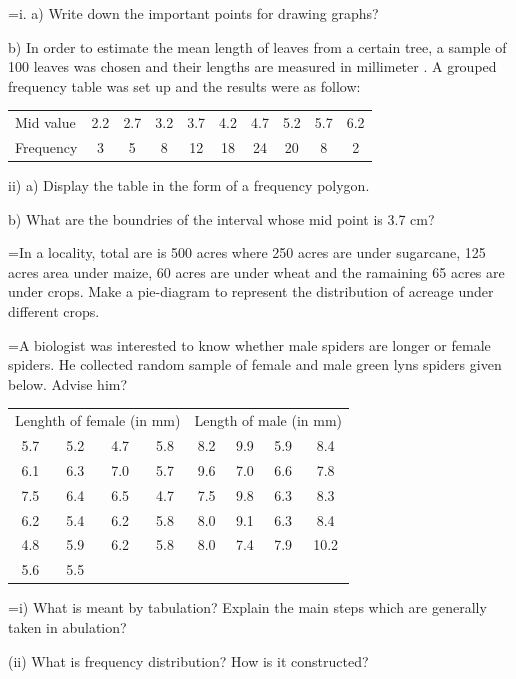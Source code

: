 \documentclass[11pt,a4paper]{article}
\newlength{\qw}
\newcommand{\q}[2]{%
  \Needspace{3\baselineskip}%
  \par\medskip\noindent\hangindent=\qw\hangafter=1\makebox[\qw][l]{\textbf{#1.}}#2\par}
\begin{document}
\q{10}{i. a) Write down the important points for drawing graphs?\par b) In order to estimate the mean length of leaves from a certain tree, a sample of 100 leaves was chosen and their lengths are measured in millimeter . A grouped frequency table was set up and the results were as follow:\par\smallskip
\begin{tabular}{|l|ccccccccc|}\hline
Mid value & 2.2 & 2.7 & 3.2 & 3.7 & 4.2 & 4.7 & 5.2 & 5.7 & 6.2\\
Frequency & 3 & 5 & 8 & 12 & 18 & 24 & 20 & 8 & 2\\\hline
\end{tabular}\par\smallskip
ii) a) Display the table in the form of a frequency polygon.\par b) What are the boundries of the interval whose mid point is 3.7 cm?}
\q{11}{In a locality, total are is 500 acres where 250 acres are under sugarcane, 125 acres area under maize, 60 acres are under wheat and the ramaining 65 acres are under crops. Make a pie-diagram to represent the distribution of acreage under different crops.}
\q{12}{A biologist was interested to know whether male spiders are longer or female spiders. He collected random sample of female and male green lyns spiders given below. Advise him?\par\smallskip
\begin{tabular}{|cccc|cccc|}\hline
\multicolumn{4}{|l|}{Lenghth of female (in mm)} & \multicolumn{4}{l|}{Length of male (in mm)}\\
5.7 & 5.2 & 4.7 & 5.8 & 8.2 & 9.9 & 5.9 & 8.4\\
6.1 & 6.3 & 7.0 & 5.7 & 9.6 & 7.0 & 6.6 & 7.8\\
7.5 & 6.4 & 6.5 & 4.7 & 7.5 & 9.8 & 6.3 & 8.3\\
6.2 & 5.4 & 6.2 & 5.8 & 8.0 & 9.1 & 6.3 & 8.4\\
4.8 & 5.9 & 6.2 & 5.8 & 8.0 & 7.4 & 7.9 & 10.2\\
5.6 & 5.5 & & & & & &\\\hline
\end{tabular}}
\q{13}{i) What is meant by tabulation? Explain the main steps which are generally taken in abulation?\par (ii) What is frequency distribution? How is it constructed?}
\end{document}
